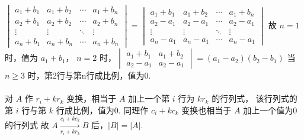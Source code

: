 	\paragraph{} %
		$\begin{vmatrix}
				a_1+b_1 & a_1+b_2 & \cdots & a_1+b_n \\
				a_2+b_1 & a_2+b_2 & \cdots & a_2+b_n \\
				\vdots  & \vdots  & \ddots & \vdots  \\
				a_n+b_1 & a_n+b_n & \cdots & a_n+b_n
			\end{vmatrix} = \begin{vmatrix}
				a_1+b_1 & a_1+b_2 & \cdots & a_1+b_n \\
				a_2-a_1 & a_2-a_1 & \cdots & a_2-a_1 \\
				\vdots  & \vdots  & \ddots & \vdots  \\
				a_n-a_1 & a_n-a_1 & \cdots & a_n-a_1
			\end{vmatrix}$
		故 $n=1$ 时，值为 $a_1+b_1$，
		$n=2$ 时，$\begin{vmatrix}
				a_1+b_1 & a_1+b_2 \\
				a_2-a_1 & a_2-a_1
			\end{vmatrix} = (a_1-a_2)(b_2-b_1)$
		当 $n \geq 3$ 时，第2行与第n行成比例，值为0.


	\paragraph{} %
		对 $A$ 作 $r_i + kr_k$ 变换，相当于 $A$ 加上一个第 $i$ 行为 $kr_k$ 的行列式，
		该行列式的第 $i$ 行与第 $k$ 行成比例，值为0.
		同理作 $c_i + kc_k$ 变换也相当于 $A$ 加上一个值为0的行列式
		故 $A \xrightarrow[r_i+kr_k]{c_i+kc_k} B$ 后，$|B| = |A|$.


